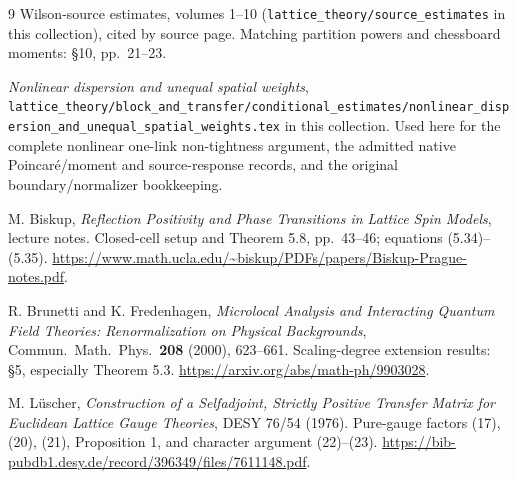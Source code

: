 \documentclass[11pt,letterpaper]{article}
\theoremstyle{plain}
\theoremstyle{remark}\newtheorem{remark}[theorem]{Scope}
\begin{document}
\begin{thebibliography}{9}
Wilson-source estimates, volumes 1--10 (\texttt{lattice\_theory/source\_estimates} in this collection), cited by source page. Matching partition
powers and chessboard moments: \S10, pp.~21--23.

\emph{Nonlinear dispersion and unequal spatial weights}, \texttt{lattice\_theory/block\_and\_transfer/conditional\_estimates/nonlinear\_dispersion\_and\_unequal\_spatial\_weights.tex} in this collection. Used here for the complete nonlinear
one-link non-tightness argument, the admitted native Poincar\'e/moment and
source-response records, and the original boundary/normalizer bookkeeping.

M. Biskup, \emph{Reflection Positivity and Phase Transitions in Lattice Spin
Models}, lecture notes. Closed-cell setup and Theorem 5.8,
pp.\ 43--46; equations (5.34)--(5.35).
\url{https://www.math.ucla.edu/~biskup/PDFs/papers/Biskup-Prague-notes.pdf}.

R. Brunetti and K. Fredenhagen,
\emph{Microlocal Analysis and Interacting Quantum Field Theories:
Renormalization on Physical Backgrounds},
Commun.\ Math.\ Phys.\ \textbf{208} (2000), 623--661.
Scaling-degree extension results: \S5, especially Theorem 5.3.
\url{https://arxiv.org/abs/math-ph/9903028}.

M. L\"uscher, \emph{Construction of a Selfadjoint, Strictly Positive Transfer
Matrix for Euclidean Lattice Gauge Theories}, DESY 76/54 (1976).
Pure-gauge factors (17), (20), (21), Proposition 1, and character argument
(22)--(23).
\url{https://bib-pubdb1.desy.de/record/396349/files/7611148.pdf}.
\end{thebibliography}
\end{document}
